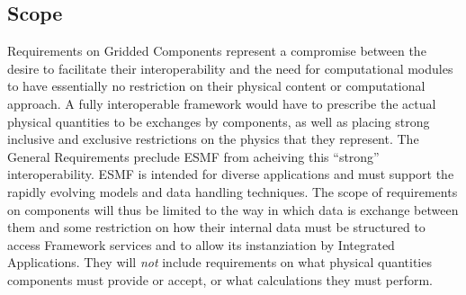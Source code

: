 \subsection{Scope}



Requirements on Gridded Components represent a compromise between
the desire to facilitate their interoperability and the need for
computational modules to have essentially no restriction on their
physical content or computational approach.
A fully interoperable framework would
have to prescribe the actual physical quantities to be exchanges
by components, as well as placing strong inclusive and exclusive 
restrictions on the physics that they represent. The General Requirements
 preclude ESMF from acheiving this  ``strong'' interoperability.
ESMF is intended for  diverse
applications and must support  the rapidly  evolving 
models and data handling techniques.
The scope of requirements on components will thus be limited to the
way in which data is exchange between them and some restriction
on how their internal data must be structured to access Framework
services and to allow its instanziation by Integrated Applications.
They will {\em not} include requirements on what physical quantities
components must provide or accept, or what calculations they
must perform.

















